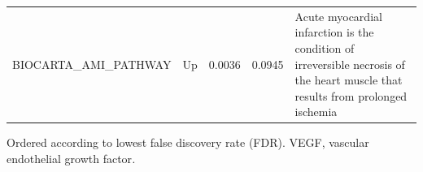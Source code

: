 \documentclass[authordate, empirical]{jote-new-article}
\begin{document}
\begin{table}[h!]
\begin{fullwidth}
\begin{tabularx}{\linewidth}{@{} X l l l X @{}}
      BIOCARTA\_AMI\_PATHWAY                                                      & Up                                                                                                          & 0.0036                                                                                                                                                       & 0.0945 & Acute myocardial infarction is the condition of irreversible necrosis of the heart muscle that results from prolonged ischemia
      \\
    \end{tabularx}
    Ordered according to lowest false discovery rate (FDR). VEGF, vascular endothelial growth factor\emph{.}
  \end{fullwidth}
\end{table}
\end{document}
